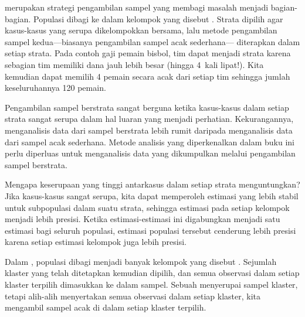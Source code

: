 merupakan strategi pengambilan sampel yang membagi masalah menjadi bagian-bagian.
Populasi dibagi ke dalam kelompok yang disebut
.
Strata dipilih agar kasus-kasus yang serupa dikelompokkan bersama, lalu metode
pengambilan sampel kedua---biasanya pengambilan sampel acak sederhana---
diterapkan dalam setiap strata.
Pada contoh gaji pemain bisbol, tim dapat menjadi strata karena sebagian tim
memiliki dana jauh lebih besar (hingga 4~kali lipat!).
Kita kemudian dapat memilih 4 pemain secara acak dari setiap tim sehingga
jumlah keseluruhannya 120 pemain.

Pengambilan sampel berstrata sangat berguna ketika kasus-kasus dalam setiap
strata sangat serupa dalam hal luaran yang menjadi perhatian. Kekurangannya,
menganalisis data dari sampel berstrata lebih rumit daripada menganalisis data
dari sampel acak sederhana. Metode analisis yang diperkenalkan dalam buku ini
perlu diperluas untuk menganalisis data yang dikumpulkan melalui pengambilan
sampel berstrata.

\begin{examplewrap}
\begin{nexample}{Mengapa keserupaan yang tinggi antarkasus
    dalam setiap strata menguntungkan?}
  Jika kasus-kasus sangat serupa, kita dapat memperoleh estimasi yang lebih
  stabil untuk subpopulasi dalam suatu strata, sehingga estimasi pada setiap
  kelompok menjadi lebih presisi. Ketika estimasi-estimasi ini digabungkan
  menjadi satu estimasi bagi seluruh populasi, estimasi populasi tersebut
  cenderung lebih presisi karena setiap estimasi kelompok juga lebih presisi.
\end{nexample}
\end{examplewrap}

Dalam , populasi dibagi menjadi
banyak kelompok yang disebut . Sejumlah
klaster yang telah ditetapkan kemudian dipilih, dan semua observasi dalam
setiap klaster terpilih dimasukkan ke dalam sampel. Sebuah
 menyerupai sampel klaster,
tetapi alih-alih menyertakan semua observasi dalam setiap klaster, kita
mengambil sampel acak di dalam setiap klaster terpilih. %

